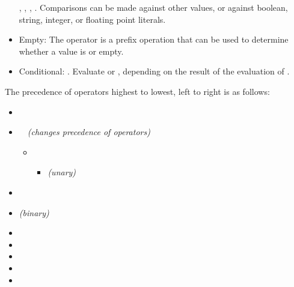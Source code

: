 \begin{itemize}
{}\foreignlanguage{english}{,
}\foreignlanguage{english}{,
}\foreignlanguage{english}{,
}\foreignlanguage{english}{.
Comparisons can be made against other values, or against boolean,
string, integer, or floating point literals. \newline
}
\item \foreignlanguage{english}{Empty: The
}\foreignlanguage{english}{
operator is a prefix operation that can be used to determine whether a
value is
}\foreignlanguage{english}{
or empty. \newline
}
\item \foreignlanguage{english}{Conditional:
}\foreignlanguage{english}{. Evaluate
}\foreignlanguage{english}{
or
}\foreignlanguage{english}{,
depending on the result of the evaluation of
}\foreignlanguage{english}{.
}
\end{itemize}
\foreignlanguage{english}{The precedence of operators highest to lowest,
left to right is as follows: }

\liststyleWWNumxix
\begin{itemize}
\item {} 
\item \textstyleHTMLTypewriter{()}~~\textit{(changes precedence of
operators)} 

\begin{itemize}
\item \begin{itemize}
\item \textit{(unary)} 
\end{itemize}
\end{itemize}
\item {} 
\item \textstyleHTMLTypewriter{+ - }\textit{(binary)} 
\item {} 
\item {} 
\item {} 
\item {} 
\item {} \textstylespv{~}
\end{itemize}